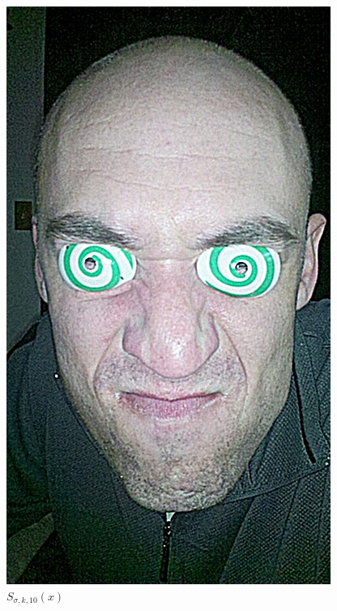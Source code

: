 \documentclass[10pt,twocolumn]{article}
\begin{document}
\begin{figure}
\begin{minipage}{0.15\textwidth}
\centering \includegraphics[width=\textwidth]{sharpface10.jpg}
\caption{$S_{\sigma, k, 10}(x)$}
\end{minipage}
\begin{minipage}{0.15\textwidth}

\end{minipage}
\end{figure}
\end{document}
